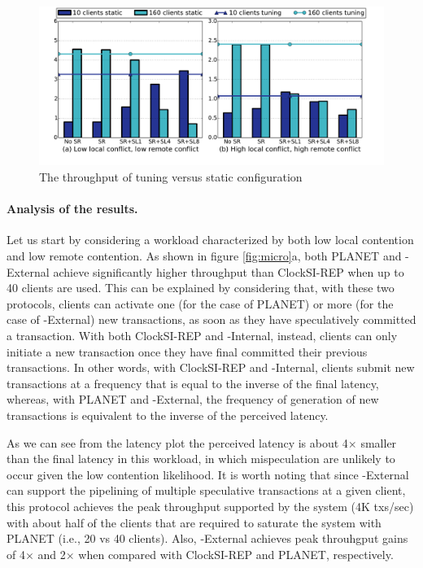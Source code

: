 \begin{figure}[t]
\centering
\def\svgwidth{0.98\columnwidth}
\includegraphics[scale = 0.28]{figures/tuning}
\vspace{-9mm}
\caption{\small The throughput of tuning versus static configuration}
\label{fig:tuning}
\end{figure}

\paragraph{Analysis of the results.} Let us start by considering a workload characterized by both low local contention and low remote contention. As shown in figure \ref{fig:micro}a, both PLANET and {\specula}-External achieve significantly higher throughput than ClockSI-REP when up to 40 clients are used. This can be explained by considering that, with these two protocols, clients can activate one (for the case of PLANET) or more (for the case of  {\specula}-External) new transactions, as soon as they have speculatively committed a transaction. With both ClockSI-REP and  {\specula}-Internal, instead, clients can only initiate a new transaction once they have final committed their previous transactions. In other words, with ClockSI-REP and  {\specula}-Internal, clients submit new transactions at a frequency that is equal to the inverse of the final latency, whereas, with PLANET and   {\specula}-External, the frequency of generation of new transactions is equivalent to the inverse of the perceived latency.

As we can see from the latency plot the perceived latency is about 4$\times$ smaller than the final latency in this workload, in which mispeculation are unlikely to occur given the low contention likelihood. It is worth noting that since {\specula}-External  can support the pipelining of multiple speculative transactions at a given client, this protocol achieves the peak throughput supported by the system (4K txs/sec) with about half of the clients that are required to saturate the system with PLANET (i.e., 20 vs 40 clients). Also, {\specula}-External achieves peak throuhgput gains of  4$\times$ and 2$\times$  when compared with ClockSI-REP and PLANET, respectively.

